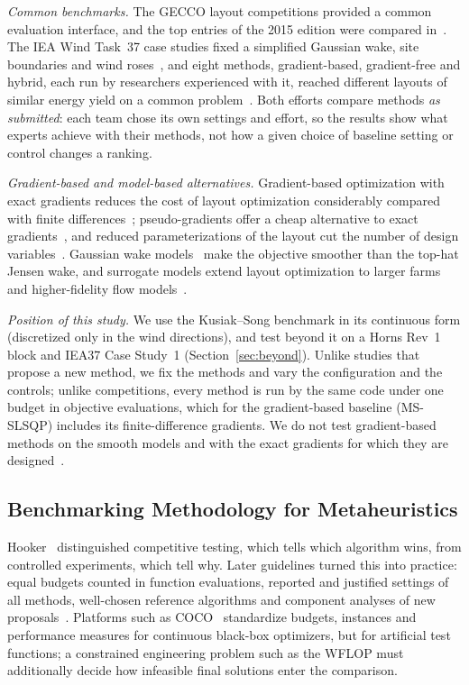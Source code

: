 \emph{Common benchmarks.} The GECCO layout competitions provided a common evaluation interface, and the top entries of the 2015 edition were compared in~\cite{Wilson2018}. The IEA Wind Task~37 case studies fixed a simplified Gaussian wake, site boundaries and wind roses~\cite{Baker2019,IEA37repo}, and eight methods, gradient-based, gradient-free and hybrid, each run by researchers experienced with it, reached different layouts of similar energy yield on a common problem~\cite{Thomas2023}. Both efforts compare methods \emph{as submitted}: each team chose its own settings and effort, so the results show what experts achieve with their methods, not how a given choice of baseline setting or control changes a ranking.

\emph{Gradient-based and model-based alternatives.} Gradient-based optimization with exact gradients reduces the cost of layout optimization considerably compared with finite differences~\cite{Guirguis2016}; pseudo-gradients offer a cheap alternative to exact gradients~\cite{Quaeghebeur2021}, and reduced parameterizations of the layout cut the number of design variables~\cite{Stanley2019}. Gaussian wake models~\cite{Bastankhah2014,Tao2020} make the objective smoother than the top-hat Jensen wake, and surrogate models extend layout optimization to larger farms and higher-fidelity flow models~\cite{Yang2023,Wang2024,Li2025}.

\emph{Position of this study.} We use the Kusiak--Song benchmark in its continuous form (discretized only in the wind directions), and test beyond it on a Horns Rev~1 block and IEA37 Case Study~1 (Section~\ref{sec:beyond}). Unlike studies that propose a new method, we fix the methods and vary the configuration and the controls; unlike competitions, every method is run by the same code under one budget in objective evaluations, which for the gradient-based baseline (MS-SLSQP) includes its finite-difference gradients. We do not test gradient-based methods on the smooth models and with the exact gradients for which they are designed~\cite{Guirguis2016,Thomas2023}.

\subsection{Benchmarking Methodology for Metaheuristics}
\label{sec:related-bench}
Hooker~\cite{Hooker1995} distinguished competitive testing, which tells which algorithm wins, from controlled experiments, which tell why. Later guidelines turned this into practice: equal budgets counted in function evaluations, reported and justified settings of all methods, well-chosen reference algorithms and component analyses of new proposals~\cite{BartzBeielstein2020,LaTorre2021}. Platforms such as COCO~\cite{Hansen2021} standardize budgets, instances and performance measures for continuous black-box optimizers, but for artificial test functions; a constrained engineering problem such as the WFLOP must additionally decide how infeasible final solutions enter the comparison.

